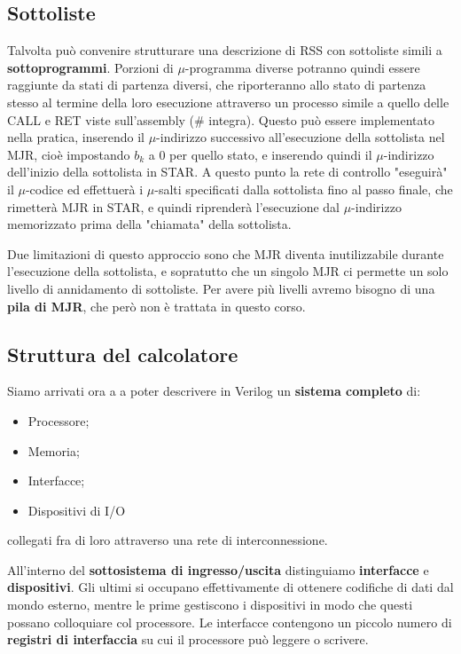 \documentclass[a4paper,11pt]{article}
\begin{document}
\subsection{Sottoliste}
Talvolta può convenire strutturare una descrizione di RSS con sottoliste simili a \textbf{sottoprogrammi}.
Porzioni di $\mu$-programma diverse potranno quindi essere raggiunte da stati di partenza diversi, che riporteranno allo stato di partenza stesso al termine della loro esecuzione attraverso un processo simile a quello delle CALL e RET viste sull'assembly (# integra).
Questo può essere implementato nella pratica, inserendo il $\mu$-indirizzo successivo all'esecuzione della sottolista nel MJR, cioè impostando $b_k$ a 0 per quello stato, e inserendo quindi il $\mu$-indirizzo dell'inizio della sottolista in STAR.
A questo punto la rete di controllo "eseguirà" il $\mu$-codice ed effettuerà i $\mu$-salti specificati dalla sottolista fino al passo finale, che rimetterà MJR in STAR, e quindi riprenderà l'esecuzione dal $\mu$-indirizzo memorizzato prima della "chiamata" della sottolista.

Due limitazioni di questo approccio sono che MJR diventa inutilizzabile durante l'esecuzione della sottolista, e sopratutto che un singolo MJR ci permette un solo livello di annidamento di sottoliste.
Per avere più livelli avremo bisogno di una \textbf{pila di MJR}, che però non è trattata in questo corso.

\subsection{Struttura del calcolatore}
Siamo arrivati ora a a poter descrivere in Verilog un \textbf{sistema completo} di:
\begin{itemize}
	\item Processore;
	\item Memoria;
	\item Interfacce;
	\item Dispositivi di I/O
\end{itemize}
collegati fra di loro attraverso una rete di interconnessione.

All'interno del \textbf{sottosistema di ingresso/uscita} distinguiamo \textbf{interfacce} e \textbf{dispositivi}.
Gli ultimi si occupano effettivamente di ottenere codifiche di dati dal mondo esterno, mentre le prime gestiscono i dispositivi in modo che questi possano colloquiare col processore.
Le interfacce contengono un piccolo numero di \textbf{registri di interfaccia} su cui il processore può leggere o scrivere.
\end{document}

